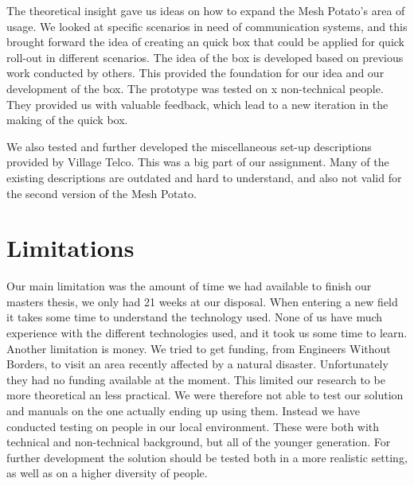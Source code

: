 The theoretical insight gave us ideas on how to expand the Mesh Potato's area of usage. We looked at specific scenarios in need of communication systems, and this brought forward the idea of creating an \gls{quick} box that could be applied for quick roll-out in different scenarios. The idea of the box is developed based on previous work conducted by others. This provided the foundation for our idea and our development of the box. The prototype was tested on x non-technical people. They provided us with valuable feedback, which lead to a new iteration in the making of the \gls{quick} box. 

We also tested and further developed the miscellaneous set-up descriptions provided by Village Telco. This was a big part of our assignment. Many of the existing descriptions are outdated and hard to understand, and also not valid for the second version of the Mesh Potato.



\section{Limitations}
Our main limitation was the amount of time we had available to finish our masters thesis, we only had 21 weeks at our disposal. When entering a new field it takes some time to understand the technology used. None of us have much experience with the different technologies used, and it took us some time to learn. Another limitation is money. We tried to get funding, from Engineers Without Borders, to visit an area recently affected by a natural disaster. Unfortunately they had no funding available at the moment. This limited our research to be more theoretical an less practical. We were therefore not able to test our solution and manuals on the one actually ending up using them. Instead we have conducted testing on people in our local environment. These were both with technical and non-technical background, but all of the younger generation. For further development the solution should be tested both in a more realistic setting, as well as on a higher diversity of people. 


